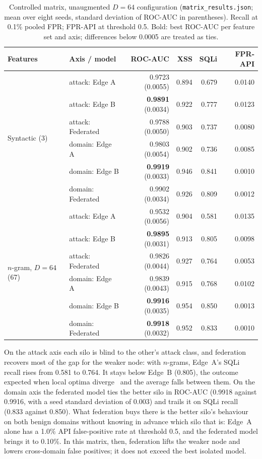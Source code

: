 \begin{table}[t]
\centering
\caption{Controlled matrix, unaugmented $D{=}64$ configuration (\texttt{matrix\_results.json}; mean over eight seeds, standard deviation of ROC-AUC in parentheses). Recall at 0.1\% pooled FPR; FPR-API at threshold 0.5. Bold: best ROC-AUC per feature set and axis; differences below 0.0005 are treated as ties.}
\label{tab:eval-matrix}
\begin{tabular}{@{}llrrrr@{}}
\toprule
\textbf{Features} & \textbf{Axis / model} & \textbf{ROC-AUC} & \textbf{XSS} & \textbf{SQLi} & \textbf{FPR-API} \\ \midrule
\multirow{6}{*}{Syntactic (3)}
 & attack: Edge A & 0.9723 (0.0055) & 0.894 & 0.679 & 0.0140 \\
 & attack: Edge B & \textbf{0.9891} (0.0034) & 0.922 & 0.777 & 0.0123 \\
 & attack: Federated & 0.9788 (0.0050) & 0.903 & 0.737 & 0.0080 \\
 & domain: Edge A & 0.9803 (0.0054) & 0.902 & 0.736 & 0.0085 \\
 & domain: Edge B & \textbf{0.9919} (0.0033) & 0.946 & 0.841 & 0.0010 \\
 & domain: Federated & 0.9902 (0.0034) & 0.926 & 0.809 & 0.0012 \\ \midrule
\multirow{6}{*}{$n$-gram, $D{=}64$ (67)}
 & attack: Edge A & 0.9532 (0.0056) & 0.904 & 0.581 & 0.0135 \\
 & attack: Edge B & \textbf{0.9895} (0.0031) & 0.913 & 0.805 & 0.0098 \\
 & attack: Federated & 0.9826 (0.0044) & 0.927 & 0.764 & 0.0053 \\
 & domain: Edge A & 0.9839 (0.0043) & 0.915 & 0.768 & 0.0102 \\
 & domain: Edge B & \textbf{0.9916} (0.0035) & 0.954 & 0.850 & 0.0013 \\
 & domain: Federated & \textbf{0.9918} (0.0032) & 0.952 & 0.833 & 0.0010 \\ \bottomrule
\end{tabular}
\end{table}

On the attack axis each silo is blind to the other's attack class, and federation recovers most of the gap for the weaker node: with $n$-grams, Edge~A's SQLi recall rises from 0.581 to 0.764. It stays below Edge~B (0.805), the outcome expected when local optima diverge~\cite{li2020convergence} and the average falls between them. On the domain axis the federated model ties the better silo in ROC-AUC (0.9918 against 0.9916, with a seed standard deviation of 0.003) and trails it on SQLi recall (0.833 against 0.850). What federation buys there is the better silo's behaviour on both benign domains without knowing in advance which silo that is: Edge~A alone has a 1.0\% API false-positive rate at threshold 0.5, and the federated model brings it to 0.10\%. In this matrix, then, federation lifts the weaker node and lowers cross-domain false positives; it does not exceed the best isolated model.

